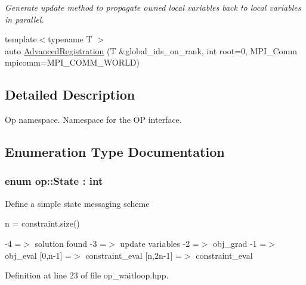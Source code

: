 \begin{DoxyCompactItemize}
\begin{DoxyCompactList}\small\item\em Generate update method to propagate owned local variables back to local variables in parallel. \end{DoxyCompactList}\item 
{\footnotesize template$<$typename T $>$ }\\auto \hyperlink{namespaceop_a81fed7b44ea9f587127221a5bc4632bc}{Advanced\-Registration} (T \&global\-\_\-ids\-\_\-on\-\_\-rank, int root=0, M\-P\-I\-\_\-\-Comm mpicomm=M\-P\-I\-\_\-\-C\-O\-M\-M\-\_\-\-W\-O\-R\-L\-D)
\end{DoxyCompactItemize}


\subsection{Detailed Description}
Op namespace. Namespace for the O\-P interface. 

\subsection{Enumeration Type Documentation}
\hypertarget{namespaceop_a17ce672f31e786a401a2a25a8308c326}{
\subsubsection[{State}]{\setlength{\rightskip}{0pt plus 5cm}enum {\bf op\-::\-State} \-: int}}\label{namespaceop_a17ce672f31e786a401a2a25a8308c326}
Define a simple state messaging scheme

n = constraint.\-size()

-\/4 =$>$ solution found -\/3 =$>$ update variables -\/2 =$>$ obj\-\_\-grad -\/1 =$>$ obj\-\_\-eval \mbox{[}0,n-\/1\mbox{]} =$>$ constraint\-\_\-eval \mbox{[}n,2n-\/1\mbox{]} =$>$ constraint\-\_\-eval 

Definition at line 23 of file op\-\_\-waitloop.\-hpp.




